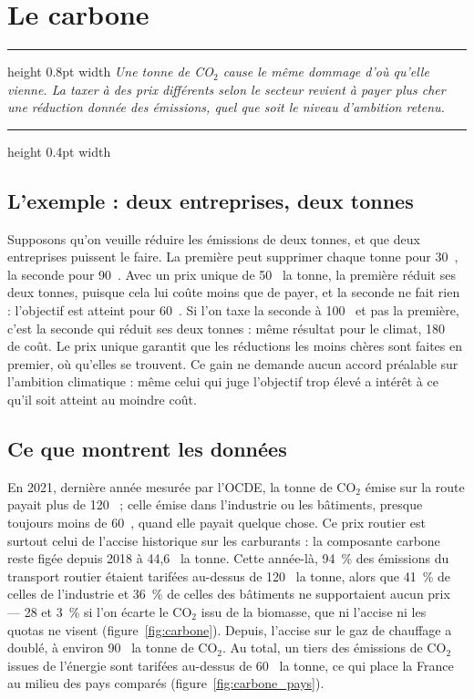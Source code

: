 \documentclass[11pt,a4paper]{article}
\providecommand{\euro}{\texteuro}
\newenvironment{argument}
  {\par\smallskip\noindent\begin{minipage}{\linewidth}%
   \color{encre}\hrule height 0.8pt width \linewidth \vspace{7pt}%
   \large\itshape}
  {\par\vspace{7pt}\hrule height 0.4pt width \linewidth\end{minipage}\par\medskip}
\begin{document}
\section{Le carbone}

\begin{argument}
Une tonne de CO$_2$ cause le même dommage d'où qu'elle vienne. La taxer à des prix différents
selon le secteur revient à payer plus cher une réduction donnée des émissions, quel que soit le
niveau d'ambition retenu.
\end{argument}

\subsection{L'exemple : deux entreprises, deux tonnes}

Supposons qu'on veuille réduire les émissions de deux tonnes, et que deux entreprises puissent le
faire. La première peut supprimer chaque tonne pour 30~\euro{}, la seconde pour 90~\euro{}. Avec un
prix unique de 50~\euro{} la tonne, la première réduit ses deux tonnes, puisque cela lui coûte moins
que de payer, et la seconde ne fait rien : l'objectif est atteint pour 60~\euro{}. Si l'on taxe la
seconde à 100~\euro{} et pas la première, c'est la seconde qui réduit ses deux tonnes : même résultat
pour le climat, 180~\euro{} de coût. Le prix unique garantit que les réductions les moins chères
sont faites en premier, où qu'elles se trouvent. Ce gain ne demande aucun accord préalable sur
l'ambition climatique : même celui qui juge l'objectif trop élevé a intérêt à ce qu'il soit atteint
au moindre coût.

\subsection{Ce que montrent les données}

En 2021, dernière année mesurée par l'OCDE, la tonne de CO$_2$ émise sur la route payait plus de
120~\euro{} ; celle émise dans l'industrie ou les bâtiments, presque toujours moins de 60~\euro{},
quand elle payait quelque chose. Ce prix routier est surtout celui de l'accise historique sur les
carburants : la composante carbone reste figée depuis 2018 à 44,6~\euro{} la tonne. Cette
année-là, 94~\% des émissions du transport routier étaient tarifées au-dessus de 120~\euro{} la
tonne, alors que 41~\% de celles de l'industrie et 36~\% de celles des bâtiments ne supportaient
aucun prix --- 28 et 3~\% si l'on écarte le CO$_2$ issu de la biomasse, que ni l'accise ni les
quotas ne visent (figure~\ref{fig:carbone}). Depuis, l'accise sur le gaz de chauffage a doublé, à
environ 90~\euro{} la tonne de CO$_2$. Au total, un tiers des émissions de CO$_2$ issues de l'énergie
sont tarifées au-dessus de 60~\euro{} la tonne, ce qui place la France au milieu des pays comparés
(figure~\ref{fig:carbone_pays}).
\end{document}
